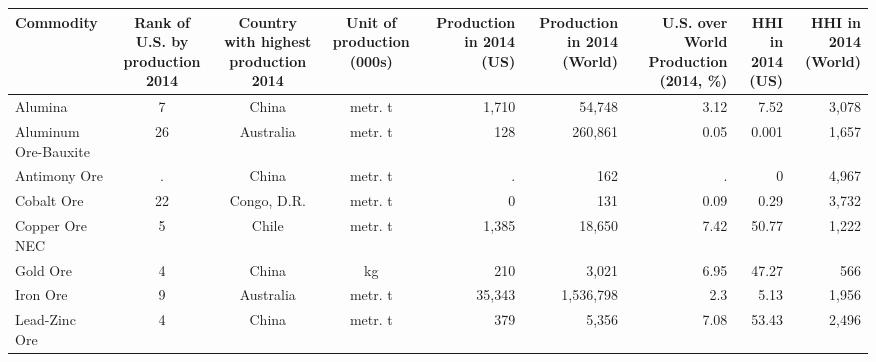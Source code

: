 \begin{tabular}{lcccrrrrr}
\hline
\multicolumn{1}{p{12em}}{Commodity} & \multicolumn{1}{p{5em}}{Rank of \newline{}U.S. by \newline{}production \newline{}2014} & \multicolumn{1}{p{7.5em}}{Country with \newline{}highest \newline{}production \newline{}2014} & \multicolumn{1}{p{5em}}{Unit of \newline{}production \newline{}(000s)} & \multicolumn{1}{p{5em}}{Production \newline{}in 2014 \newline{}(US)} & \multicolumn{1}{p{5em}}{Production \newline{}in 2014 \newline{}(World)} & \multicolumn{1}{p{5em}}{U.S. over \newline{}World \newline{}Production \newline{}(2014, \%)} & \multicolumn{1}{p{5em}}{HHI in \newline{}2014 \newline{}(US)} & \multicolumn{1}{p{5em}}{HHI in \newline{}2014 \newline{}(World)} \bigstrut\\
\hline
Alumina & 7     & China & metr. t & 1,710  & 54,748  & 3.12  & 7.52  & 3,078  \bigstrut[t]\\
Aluminum Ore-Bauxite & 26    & Australia & metr. t & 128   & 260,861  & 0.05  & 0.001 & 1,657  \\
Antimony Ore & .     & China & metr. t & .     & 162   & .     & 0     & 4,967  \\
Cobalt Ore & 22    & Congo, D.R. & metr. t & 0     & 131   & 0.09  & 0.29  & 3,732  \\
Copper Ore NEC & 5     & Chile & metr. t & 1,385  & 18,650  & 7.42  & 50.77 & 1,222  \\
Gold Ore & 4     & China & kg    & 210   & 3,021  & 6.95  & 47.27 & 566  \\
Iron Ore & 9     & Australia & metr. t & 35,343  & 1,536,798  & 2.3   & 5.13  & 1,956  \\
Lead-Zinc Ore & 4     & China & metr. t & 379   & 5,356  & 7.08  & 53.43 & 2,496  \\

\end{tabular}
